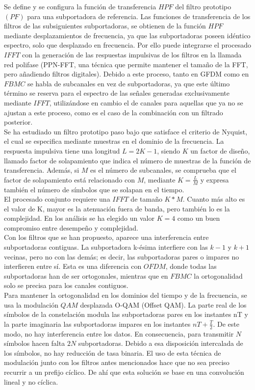 \documentclass[]{article}
\begin{document}
Se define y se configura la función de transferencia $HPF$ del filtro prototipo $(PF)$ para una subportadora de referencia. Las funciones de transferencia de los filtros de las subsiguientes subportadoras, se obtienen de la función $HPF$ mediante desplazamientos de frecuencia, ya que las subportadoras poseen idéntico espectro, solo que desplazado en frecuencia. Por ello puede integrarse el procesado $IFFT$ con la generación de las respuestas impulsivas de los filtros en la llamada red polifase (PPN-FFT, una técnica que permite mantener el tamaño de la FFT, pero añadiendo filtros digitales). Debido a este proceso, tanto en GFDM como en $FBMC$ se habla de subcanales en vez de subportadoras, ya que este último término se reserva para el espectro de las señales generadas exclusivamente mediante $IFFT$, utilizándose en cambio el de canales para aquellas que ya no se ajustan a este proceso, como es el caso de la combinación con un filtrado posterior.\\

Se ha estudiado un filtro prototipo paso bajo que satisface el criterio de Nyquist, el cual se especifica mediante muestras en el dominio de la frecuencia. La respuesta impulsiva tiene una longitud $L = 2K-1$, siendo $K$ un factor de diseño, llamado factor de solapamiento que indica el número de muestras de la función de transferencia.
Además, si $M$ es el número de subcanales, se comprueba que el factor de solapamiento está relacionado con $M$, mediante $K = \frac{L}{M}$ y expresa también el número de símbolos que se solapan en el tiempo.\\

El procesado conjunto requiere una $IFFT$ de tamaño $K*M$. Cuanto más alto es el valor de K, mayor es la atenuación fuera de banda, pero también lo es la complejidad. En los análisis se ha elegido un valor $K=4$ como un buen compromiso entre desempeño y complejidad.\\
 
Con los filtros que se han propuesto, aparece una interferencia entre subportadoras contiguas. La subportadora k-ésima interfiere con las $k-1$ y $k+1$ vecinas, pero no con las demás; es decir, las subportadoras pares o impares no interfieren entre sí. Esta es una diferencia con $OFDM$, donde todas las subportadoras han de ser ortogonales, mientras que en $FBMC$ la ortogonalidad solo se precisa para los canales contiguos.\\
 
Para mantener la ortogonalidad en los dominios del tiempo y de la frecuencia, se usa la modulación $QAM$ desplazada O-QAM (Offset QAM). La parte real de los símbolos de la constelación modula las subportadoras pares en los instantes nT y la parte imaginaria las subportadoras impares en los instantes $nT+\frac{T}{2}$. De este modo, no hay interferencia entre los datos. En consecuencia, para transmitir $N$ símbolos hacen falta $2N$ subportadoras. Debido a esa disposición intercalada de los símbolos, no hay reducción de tasa binaria. El uso de esta técnica de modulación junto con los filtros antes mencionados hace que no sea preciso recurrir a un prefijo cíclico. De ahí que esta solución se base en una convolución lineal y no cíclica.\\
 
\end{document}
